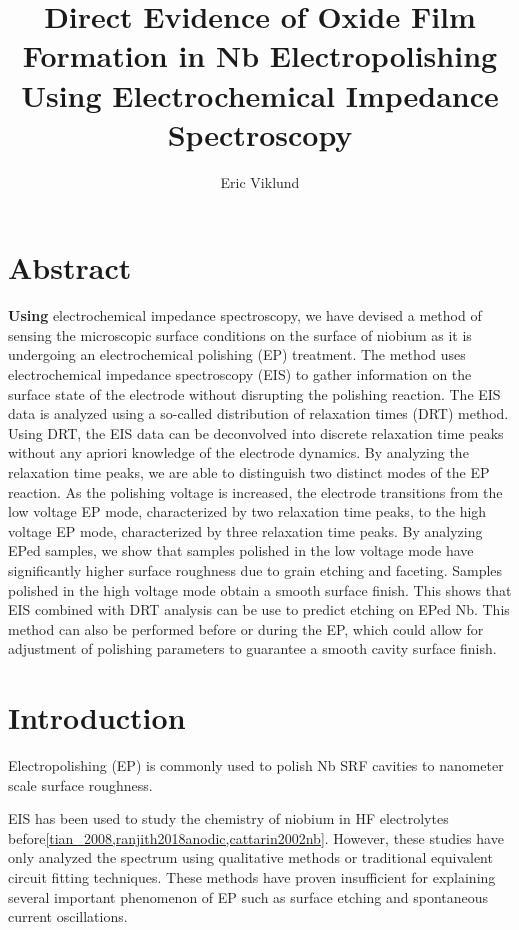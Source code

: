 \documentclass[11pt]{article}
\author{Eric Viklund}
\date{\date}
\title{Direct Evidence of Oxide Film Formation in Nb Electropolishing Using Electrochemical Impedance Spectroscopy}
\begin{document}
\maketitle
\tableofcontents


\section{Abstract}
\label{sec:org4ffe8c0}
\textbf{Using} electrochemical impedance spectroscopy, we have devised a method of sensing the microscopic surface conditions on the surface of niobium as it is undergoing an electrochemical polishing (EP) treatment. The method uses electrochemical impedance spectroscopy (EIS) to gather information on the surface state of the electrode without disrupting the polishing reaction. The EIS data is analyzed using a so-called distribution of relaxation times (DRT) method. Using DRT, the EIS data can be deconvolved into discrete relaxation time peaks without any apriori knowledge of the electrode dynamics. By analyzing the relaxation time peaks, we are able to distinguish two distinct modes of the EP reaction. As the polishing voltage is increased, the electrode transitions from the low voltage EP mode, characterized by two relaxation time peaks, to the high voltage EP mode, characterized by three relaxation time peaks. By analyzing EPed samples, we show that samples polished in the low voltage mode have significantly higher surface roughness due to grain etching and faceting. Samples polished in the high voltage mode obtain a smooth surface finish. This shows that EIS combined with DRT analysis can be use to predict etching on EPed Nb. This method can also be performed before or during the EP, which could allow for adjustment of polishing parameters to guarantee a smooth cavity surface finish.

\section{Introduction}
\label{sec:org5ef967f}
Electropolishing (EP) is commonly used to polish Nb SRF cavities to nanometer scale surface roughness. 

EIS has been used to study the chemistry of niobium in HF electrolytes before\ref{tian_2008,ranjith2018anodic,cattarin2002nb}. However, these studies have only analyzed the spectrum using qualitative methods or traditional equivalent circuit fitting techniques. These methods have proven insufficient for explaining several important phenomenon of EP such as surface etching and spontaneous current oscillations.
\end{document}
